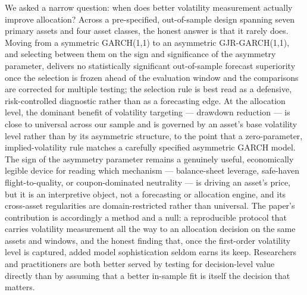 We asked a narrow question: when does better volatility measurement actually improve allocation? Across a pre-specified, out-of-sample design spanning seven primary assets and four asset classes, the honest answer is that it rarely does. Moving from a symmetric GARCH(1,1) to an asymmetric GJR-GARCH(1,1), and selecting between them on the sign and significance of the asymmetry parameter, delivers no statistically significant out-of-sample forecast superiority once the selection is frozen ahead of the evaluation window and the comparisons are corrected for multiple testing; the selection rule is best read as a defensive, risk-controlled diagnostic rather than as a forecasting edge. At the allocation level, the dominant benefit of volatility targeting --- drawdown reduction --- is close to universal across our sample and is governed by an asset's base volatility level rather than by its asymmetric structure, to the point that a zero-parameter, implied-volatility rule matches a carefully specified asymmetric GARCH model. The sign of the asymmetry parameter remains a genuinely useful, economically legible device for reading which mechanism --- balance-sheet leverage, safe-haven flight-to-quality, or coupon-dominated neutrality --- is driving an asset's price, but it is an interpretive object, not a forecasting or allocation engine, and its cross-asset regularities are domain-restricted rather than universal. The paper's contribution is accordingly a method and a null: a reproducible protocol that carries volatility measurement all the way to an allocation decision on the same assets and windows, and the honest finding that, once the first-order volatility level is captured, added model sophistication seldom earns its keep. Researchers and practitioners are both better served by testing for decision-level value directly than by assuming that a better in-sample fit is itself the decision that matters.
